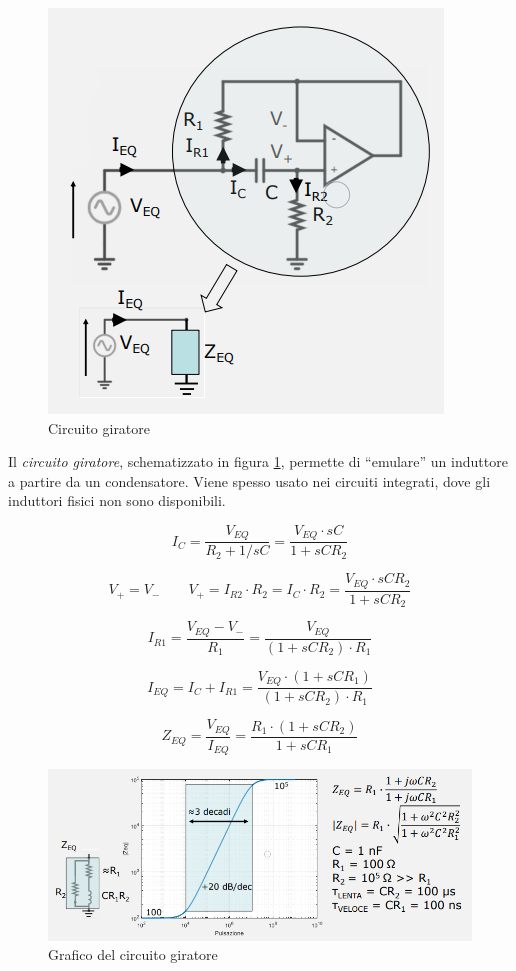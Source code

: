 \documentclass{article}
\begin{document}
\clearpage
\begin{figure}[h]
  \centering
  \includegraphics[scale=0.5]{IM_circuito_giratore}
  \caption{Circuito giratore}
  \label{Schema_circuito_giratore}
\end{figure}

Il \textit{circuito giratore}, schematizzato in figura \ref{Schema_circuito_giratore}, permette di “emulare” un induttore a partire da un condensatore. Viene spesso usato nei circuiti integrati, dove gli induttori fisici non sono disponibili.

\[I_C = \frac{V_{EQ}}{R_2 + 1/sC} = \frac{V_{EQ} \cdot sC}{1 + sCR_2}\]

\[V_+ = V_-  \quad \quad V_+ = I_{R2} \cdot R_2 = I_C \cdot R_2 = \frac{V_{EQ} \cdot sCR_2}{1 + sCR_2}\]

\[I_{R1} = \frac{V_{EQ} - V_-}{R_1} = \frac{V_{EQ}}{(1 + sCR_2) \cdot R_1}\]

\[I_{EQ} = I_C + I_{R1} = \frac{V_{EQ} \cdot (1 + sCR_1)}{(1 + sCR_2) \cdot R_1}\]

\[Z_{EQ} = \frac{V_{EQ}}{I_{EQ}} = \frac{R_1 \cdot (1 + sCR_2)}{1 + sCR_1}\]

\begin{figure}[h]
  \centering
  \includegraphics[scale=0.55]{IM_circuito_giratore_grafico}
  \caption{Grafico del circuito giratore}
  \label{Schema_circuito_giratore_grafico}
\end{figure}
\end{document}
